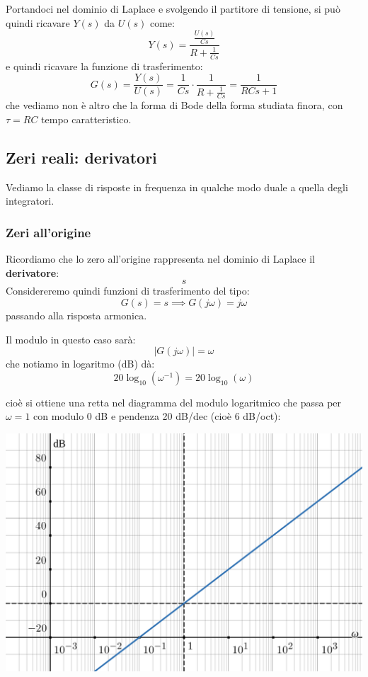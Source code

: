 \documentclass[a4paper,11pt]{article}
\begin{document}
Portandoci nel dominio di Laplace e svolgendo il partitore di tensione, si può quindi ricavare $Y(s)$ da $U(s)$ come:
$$
Y(s) = \frac{ \frac{U(s)}{Cs} }{ R + \frac{1}{Cs} }
$$
e quindi ricavare la funzione di trasferimento:
$$
G(s) = \frac{Y(s)}{U(s)} = \frac{1}{Cs} \cdot \frac{1}{R + \frac{1}{Cs}} = \frac{1}{RCs + 1}
$$
che vediamo non è altro che la forma di Bode della forma studiata finora, con $\tau = RC$ tempo caratteristico.

\subsection{Zeri reali: derivatori}
Vediamo la classe di risposte in frequenza in qualche modo duale a quella degli integratori.

\subsubsection{Zeri all'origine} 
Ricordiamo che lo zero all'origine rappresenta nel dominio di Laplace il \textbf{derivatore}:
$$
s
$$
Considereremo quindi funzioni di trasferimento del tipo:
$$
G(s) = s \implies G(j \omega) = j \omega
$$
passando alla risposta armonica.

Il modulo in questo caso sarà:
$$
|G(j \omega)| = \omega
$$
che notiamo in logaritmo (dB) dà:
$$
20 \log_{10} \left( \omega^{-1} \right) = 20 \log_{10} (\omega)
$$

\par\medskip

\noindent
\begin{minipage}{\textwidth}
cioè si ottiene una retta nel diagramma del modulo logaritmico che passa per $\omega =1$ con modulo 0 dB e pendenza 20 dB/dec (cioè 6 dB/oct):
\begin{center}
	\includegraphics[scale=0.3]{../figures/differentiator_bode/mod.png}
\end{center}
\end{minipage}
\end{document}
